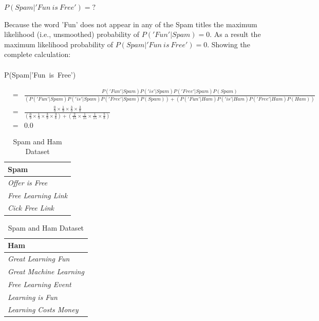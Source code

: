 \documentclass[solution]{ditpaper}
\begin{document}
\begin{enumerate}
					\begin{center}
				$P(Spam|'Fun~is~Free')=?$
			\end{center}
			\begin{answer}
				Because the word 'Fun' does not appear in any of the Spam titles the maximum likelihood (i.e., unsmoothed) probability of $P('Fun'|Spam)=0$. As a result the maximum likelihood probability of $P(Spam|'Fun~is~Free')=0$. Showing the complete calculation: \\
				\\
				P(Spam|'Fun~is~Free')
				\begin{scriptsize}
				\begin{eqnarray*}
					&=& \frac{P('Fun'|Spam)P('is'|Spam)P('Free'|Spam)P(Spam)}{(P('Fun'|Spam)P('is'|Spam)P('Free'|Spam)P(Spam))+(P('Fun'|Ham)P('is'|Ham)P('Free'|Ham)P(Ham))}\\
					&=& \frac{\frac{0}{9} \times \frac{1}{9} \times \frac{3}{9} \times \frac{3}{8}}{(\frac{0}{9} \times \frac{1}{9} \times \frac{3}{9} \times \frac{3}{8})+(\frac{2}{15} \times \frac{1}{15} \times \frac{1}{15} \times \frac{5}{8})}\\
					&=& 0.0
				\end{eqnarray*}
				\end{scriptsize}
			\end{answer}
	\end{enumerate}

\newpage

\begin{table}[!htb]
    \caption{Spam and Ham Dataset}
    \begin{minipage}{.5\linewidth}
      \centering
\begin{tabular}{l}
\textbf{Spam}\\
\hline
\textit{Offer is Free}\\
\textit{Free Learning Link}\\
\textit{Cick Free Link}\\
\hline
\end{tabular}
    \end{minipage}%
    \begin{minipage}{.5\linewidth}
      \centering
\begin{tabular}{l}
\textbf{Ham}\\
\hline
\textit{Great Learning Fun}\\
\textit{Great Machine Learning}\\
\textit{Free Learning Event}\\
\textit{Learning is Fun}\\
\textit{Learning Costs Money}\\
\hline
\end{tabular}
    \end{minipage} 
    \label{tab:spamhamdata}
\end{table}
\end{document}
